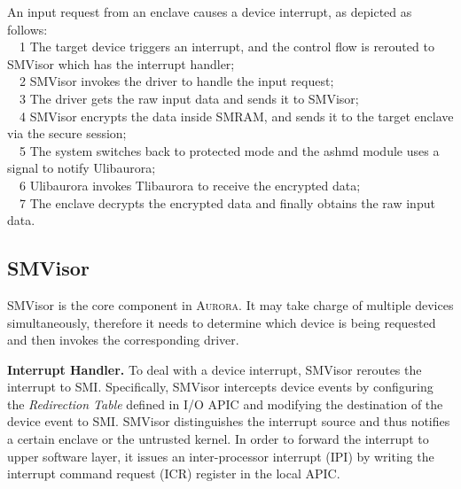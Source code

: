 \documentclass[journal,twocolumn,letterpaper,10pt]{IEEEtran}
\begin{document}
\par
An input request from an enclave causes a device interrupt, as depicted as follows:\\
~~\textcircled{\footnotesize{1}} The target device triggers an interrupt, and the control flow is rerouted to SMVisor which has the interrupt handler;\\
~~\textcircled{\footnotesize{2}} SMVisor invokes the driver to handle the input request;\\
~~\textcircled{\footnotesize{3}} The driver gets the raw input data and sends it to SMVisor;\\
~~\textcircled{\footnotesize{4}} SMVisor encrypts the data inside SMRAM, and sends it to the target enclave via the secure session;\\
~~\textcircled{\footnotesize{5}} The system switches back to protected mode and the ashmd module uses a signal to notify Ulibaurora;\\
~~\textcircled{\footnotesize{6}} Ulibaurora invokes Tlibaurora to receive the encrypted data;\\
~~\textcircled{\footnotesize{7}} The enclave decrypts the encrypted data and finally obtains the raw input data. %
\fi

\subsection{SMVisor}\label{ssv}

SMVisor is the core component in \textsc{Aurora}.  It may take charge of multiple devices simultaneously, therefore it needs to determine which device is being requested and then invokes the corresponding driver. 

\textbf{Interrupt Handler.} To deal with a device interrupt, SMVisor reroutes the interrupt to SMI. Specifically, SMVisor intercepts device events by configuring the \textit{Redirection Table} defined in I/O APIC and modifying the destination of the device event to SMI. SMVisor distinguishes the interrupt source and thus notifies a certain enclave or the untrusted kernel. In order to forward the interrupt to upper software layer, it issues an inter-processor interrupt (IPI) by writing the interrupt command request (ICR) register in the local APIC. 
\end{document}
